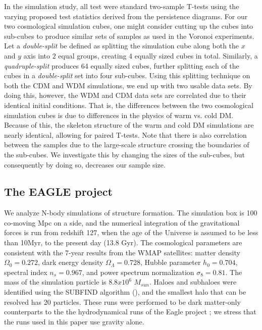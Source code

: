 \documentclass[12pt]{article}
\begin{document}
In the simulation study, all test were standard two-sample T-tests  using the varying proposed test statistics derived from the persistence diagrams.  For our two cosmological simulation cubes, one might consider cutting up the cubes into sub-cubes to produce similar sets of samples as used in the Voronoi experiments. Let a \textit{double-split} be defined as splitting the simulation cube along both the $x$ and $y$ axis into $2$ equal groups, creating 4 equally sized cubes in total. Similarly, a \textit{quadruple-split} produces 64 equally sized cubes, further splitting each of the cubes in a \textit{double-split} set into four sub-cubes. Using this splitting technique on both the CDM and WDM simulations, we end up with two usable data sets. By doing this, however, the WDM and CDM data sets are correlated due to their identical initial conditions.  That is, the differences between the two cosmological simulation cubes is due to differences in the physics of warm vs. cold DM.  Because of this, the skeleton structure of the warm and cold DM simulations are nearly identical, allowing for paired T-tests.  Note that there is also correlation between the samples due to the large-scale structure crossing the boundaries of the sub-cubes.  We investigate this by changing the sizes of the sub-cubes, but consequently by doing so, decreases our sample size.

\subsection{The EAGLE project}
We analyze N-body simulations of structure formation. The simulation box is 100 co-moving Mpc on a side, and the numerical integration of the gravitational forces is run from redshift 127, when the age of the Universe is assumed to be less than 10Myr, to the present day (13.8 Gyr). The cosmological parameters are consistent with the 7-year results from the WMAP satellites: matter density $\Omega_0 = 0.272$, dark energy density $\Omega_{\Lambda} = 0.728$, Hubble parameter $h_0 = 0.704$, spectral index $n_s=0.967$, and power spectrum normalization $\sigma_8=0.81$. The mass of the simulation particle is $8.8x10^6$ $M_{sun}$. Haloes and subhaloes were identified using the SUBFIND algorithm (\cite{springel2001populating}), and the smallest halo that can be resolved has 20 particles. These runs were performed to be dark matter-only counterparts to the the hydrodynamical runs of the Eagle project \cite{schaye2015eagle}; we stress that the runs used in this paper use gravity alone. 
\end{document}

